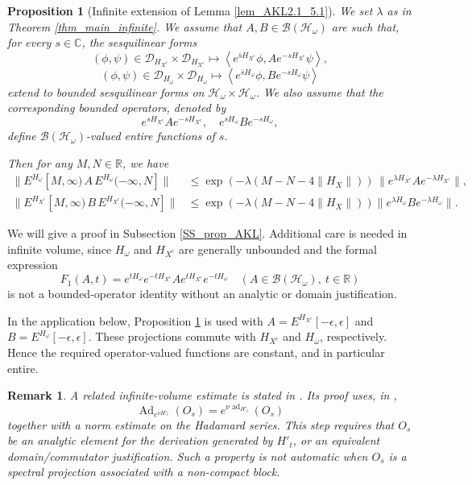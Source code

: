 \documentclass[11pt]{article}
\numberwithin{equation}{section}
\newtheorem{proposition}[theorem]{Proposition}
\newtheorem{remark}[theorem]{Remark}
\begin{document}
\begin{proposition}[Infinite extension of Lemma \ref{lem_AKL2.1_5.1}]\label{prop_AKL}
We set $\lambda$ as in Theorem \ref{thm_main_infinite}. We assume that $A,B\in\mathcal{B}(\mathcal{H}_\omega)$ are such that, for every $s\in\mathbb{C}$, the sesquilinear forms
\[
(\phi,\psi)\in\mathcal{D}_{H_{X^c}}\times\mathcal{D}_{H_{X^c}}
\mapsto
\left\langle e^{\bar{s} H_{X^c}}\phi,
A e^{-sH_{X^c}}\psi\right\rangle,
\]
\[
(\phi,\psi)\in\mathcal D_{H_\omega}\times \mathcal D_{H_\omega}
\mapsto
\left\langle e^{\bar{s} H_\omega}\phi,
B e^{-sH_\omega} \psi\right\rangle
\]
extend to bounded sesquilinear forms on $\mathcal{H}_\omega\times\mathcal{H}_\omega$. We also assume that the corresponding bounded operators, denoted by
\[
e^{sH_{X^c}}Ae^{-sH_{X^c}},\quad e^{sH_\omega}Be^{-sH_\omega},
\]
define $\mathcal{B}(\mathcal H_\omega)$-valued entire functions of $s$.

Then for any $M,N\in\mathbb{R}$, we have
\begin{align*}
\|E^{H_\omega}[M,\infty) \,A\,
E^{H_\omega}(-\infty,N]\|
&\leq\exp(-\lambda(M-N-4\|H_X\|))\,
\|e^{\lambda H_{X^c}}Ae^{-\lambda H_{X^c}}\|,\\
\|E^{H_{X^c}}[M,\infty) \,B\,
E^{H_{X^c}}(-\infty,N]\|
&\leq\exp(-\lambda(M-N-4\|H_X\|))
\|e^{\lambda H_\omega}Be^{-\lambda H_\omega}\|.
\end{align*}
\end{proposition}

We will give a proof in Subsection \ref{SS_prop_AKL}. Additional care is needed in infinite volume, since $H_\omega$ and $H_{X^c}$ are generally unbounded and the formal expression
\[
F_1(A,t)=e^{tH_\omega}e^{-tH_{X^c}} Ae^{tH_{X^c}}e^{-tH_\omega} \quad(A\in\mathcal{B}(\mathcal{H}_\omega),\ t\in\mathbb{R})
\]
is not a bounded-operator identity without an analytic or domain
justification.

In the application below, Proposition \ref{prop_AKL} is used with $A=E^{H_{X^c}}[-\epsilon,\epsilon]$ and $B=E^{H_\omega}[-\epsilon,\epsilon]$. These projections commute with $H_{X^c}$ and $H_\omega$, respectively. Hence the required operator-valued functions are constant, and in particular entire.

\begin{remark}\label{rmk_hadamard_infinite}
A related infinite-volume estimate is stated in \cite[Lemma C.6]{Liu-Yi-Zhou-Zou2025}. Its proof uses, in \cite[Eq. (C.89)-(C.90)]{Liu-Yi-Zhou-Zou2025},
\[
\operatorname{Ad}_{e^{\nu H'_t}}(O_s)
=e^{\nu\operatorname{ad}_{H'_t}}(O_s)
\]
together with a norm estimate on the Hadamard series. This step requires that $O_s$ be an analytic element for the derivation generated by $H'_t$, or an equivalent domain/commutator justification. Such a property is not automatic when $O_s$ is a spectral projection associated with a non-compact block.
\end{remark}
\end{document}
